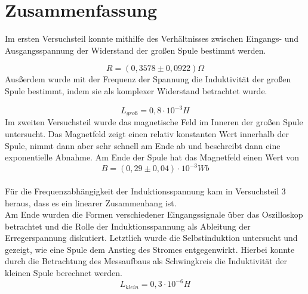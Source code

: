 \chapter{Zusammenfassung}
    Im ersten Versuchsteil konnte mithilfe des Verhältnisses zwischen Eingangs- und Ausgangsspannung der Widerstand der großen Spule bestimmt werden.
    
   \begin{equation*}
   		R = (0,3578 \pm 0,0922) \Omega
   \end{equation*}
    Ausßerdem wurde mit der Frequenz der Spannung die Induktivität der großen Spule bestimmt, indem sie als komplexer Widerstand betrachtet wurde.
    
    \begin{equation*}
   		L_{gro\textit{ß}{}} = 0,8 \cdot 10^{-3} H
   \end{equation*}
   Im zweiten Versuchsteil wurde das magnetische Feld im Inneren der großen Spule untersucht. Das Magnetfeld zeigt einen relativ konstanten Wert innerhalb der Spule, nimmt dann aber sehr schnell am Ende ab und beschreibt dann eine exponentielle Abnahme. Am Ende der Spule hat das Magnetfeld einen Wert von 
   \begin{equation*}
   		B = (0,29 \pm 0,04)\cdot 10^{-3} Wb
   \end{equation*}
   \\
    Für die Frequenzabhängigkeit der Induktionsspannung kam in Versuchsteil 3 heraus, dass es ein linearer Zusammenhang ist.
    \\
    Am Ende wurden die Formen verschiedener Eingangssignale über das Oszilloskop betrachtet und die Rolle der Induktionsspannung als Ableitung der Erregerspannung diskutiert. Letztlich wurde die Selbstinduktion untersucht und gezeigt, wie eine Spule dem Anstieg des Stromes entgegenwirkt. Hierbei konnte durch die Betrachtung des Messaufbaus als Schwingkreis die Induktivität der kleinen Spule berechnet werden.\\
    \begin{equation*}
   		L_{klein} = 0,3 \cdot 10^{-6} H
   \end{equation*}
    
	\pagebreak

